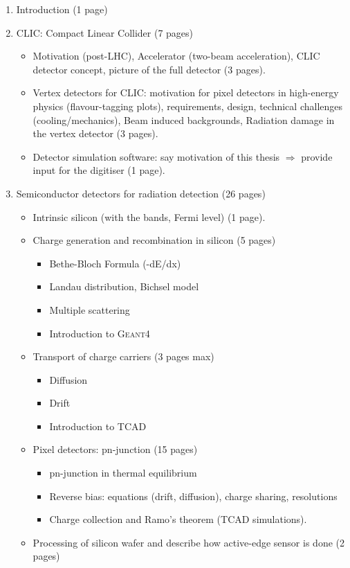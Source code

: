 

\begin{enumerate}
\item Introduction (1 page)
\item CLIC: Compact Linear Collider (7 pages)
  \begin{itemize}
  \item Motivation (post-LHC), Accelerator (two-beam acceleration),
    CLIC detector concept, picture of the full detector (3 pages).
  \item Vertex detectors for CLIC: motivation for pixel
    detectors in high-energy physics (flavour-tagging plots), requirements,
    design, technical challenges (cooling/mechanics), Beam induced
    backgrounds, Radiation damage in the vertex detector (3
    pages). 
  \item Detector simulation software: say motivation of this thesis 
    $\Rightarrow$ provide input for the digitiser (1 page).
  \end{itemize}
  
\item Semiconductor detectors for radiation detection (26 pages)
  \begin{itemize}
  \item Intrinsic silicon (with the bands, Fermi level) (1 page).
  \item Charge generation and recombination in silicon (5 pages)
    \begin{itemize}
    \item Bethe-Bloch Formula (-dE/dx)
    \item Landau distribution, Bichsel model
    \item Multiple scattering
    \item Introduction to \textsc{Geant4}
    \end{itemize}
  \item Transport of charge carriers (3 pages max)
    \begin{itemize}
    \item Diffusion
    \item Drift
    \item Introduction to TCAD
    \end{itemize}
  \item Pixel detectors: pn-junction (15 pages)
    \begin{itemize}
    \item pn-junction in thermal equilibrium
    \item Reverse bias: equations (drift, diffusion), charge sharing,
      resolutions
    \item Charge collection and Ramo's theorem (TCAD simulations).
    \end{itemize}
  \item Processing of silicon wafer and describe how active-edge
    sensor is done (2 pages)
  \end{itemize}


\end{enumerate}

